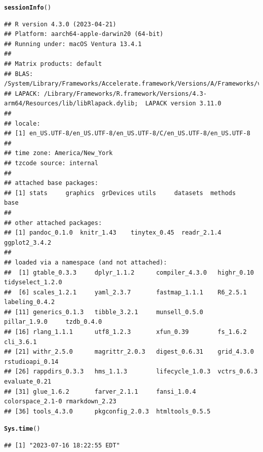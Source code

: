 \documentclass{article}\usepackage[]{graphicx}\usepackage[]{xcolor}
\makeatletter
\newcommand{\hlstd}[1]{\textcolor[rgb]{0.345,0.345,0.345}{#1}}%
\newcommand{\hlkwd}[1]{\textcolor[rgb]{0.737,0.353,0.396}{\textbf{#1}}}%
\newenvironment{kframe}{%
 \def\at@end@of@kframe{}%
 \ifinner\ifhmode%
  \def\at@end@of@kframe{\end{minipage}}%
  \begin{minipage}{\columnwidth}%
 \fi\fi%
 \def\FrameCommand##1{\hskip\@totalleftmargin \hskip-\fboxsep
 \colorbox{shadecolor}{##1}\hskip-\fboxsep
     \hskip-\linewidth \hskip-\@totalleftmargin \hskip\columnwidth}%
 \MakeFramed {\advance\hsize-\width
   \@totalleftmargin\z@ \linewidth\hsize
   \@setminipage}}%
 {\par\unskip\endMakeFramed%
 \at@end@of@kframe}
\newenvironment{knitrout}{}{} %
\makeatother
\begin{document}
\begin{knitrout}
\color{fgcolor}\begin{kframe}
\begin{alltt}
\hlkwd{sessionInfo}\hlstd{()}
\end{alltt}
\begin{verbatim}
## R version 4.3.0 (2023-04-21)
## Platform: aarch64-apple-darwin20 (64-bit)
## Running under: macOS Ventura 13.4.1
## 
## Matrix products: default
## BLAS:   /System/Library/Frameworks/Accelerate.framework/Versions/A/Frameworks/vecLib.framework/Versions/A/libBLAS.dylib 
## LAPACK: /Library/Frameworks/R.framework/Versions/4.3-arm64/Resources/lib/libRlapack.dylib;  LAPACK version 3.11.0
## 
## locale:
## [1] en_US.UTF-8/en_US.UTF-8/en_US.UTF-8/C/en_US.UTF-8/en_US.UTF-8
## 
## time zone: America/New_York
## tzcode source: internal
## 
## attached base packages:
## [1] stats     graphics  grDevices utils     datasets  methods   base     
## 
## other attached packages:
## [1] pandoc_0.1.0  knitr_1.43    tinytex_0.45  readr_2.1.4   ggplot2_3.4.2
## 
## loaded via a namespace (and not attached):
##  [1] gtable_0.3.3     dplyr_1.1.2      compiler_4.3.0   highr_0.10       tidyselect_1.2.0
##  [6] scales_1.2.1     yaml_2.3.7       fastmap_1.1.1    R6_2.5.1         labeling_0.4.2  
## [11] generics_0.1.3   tibble_3.2.1     munsell_0.5.0    pillar_1.9.0     tzdb_0.4.0      
## [16] rlang_1.1.1      utf8_1.2.3       xfun_0.39        fs_1.6.2         cli_3.6.1       
## [21] withr_2.5.0      magrittr_2.0.3   digest_0.6.31    grid_4.3.0       rstudioapi_0.14 
## [26] rappdirs_0.3.3   hms_1.1.3        lifecycle_1.0.3  vctrs_0.6.3      evaluate_0.21   
## [31] glue_1.6.2       farver_2.1.1     fansi_1.0.4      colorspace_2.1-0 rmarkdown_2.23  
## [36] tools_4.3.0      pkgconfig_2.0.3  htmltools_0.5.5
\end{verbatim}
\begin{alltt}
\hlkwd{Sys.time}\hlstd{()}
\end{alltt}
\begin{verbatim}
## [1] "2023-07-16 18:22:55 EDT"
\end{verbatim}
\end{kframe}
\end{knitrout}
\end{document}
